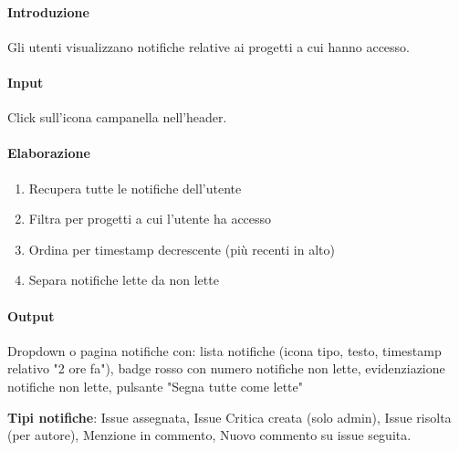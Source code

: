 \begin{reqbox}[title=REQ-FUN-19: Visualizza Notifiche]
\label{subsubsec:req-visualizza-notifiche}

\paragraph{Introduzione}
Gli utenti visualizzano notifiche relative ai progetti a cui hanno accesso.

\paragraph{Input}
Click sull'icona campanella nell'header.

\paragraph{Elaborazione}
\begin{enumerate}[leftmargin=1.1em]
\item Recupera tutte le notifiche dell'utente
\item Filtra per progetti a cui l'utente ha accesso
\item Ordina per timestamp decrescente (più recenti in alto)
\item Separa notifiche lette da non lette
\end{enumerate}

\paragraph{Output}
Dropdown o pagina notifiche con: lista notifiche (icona tipo, testo, timestamp relativo "2 ore fa"), badge rosso con numero notifiche non lette, evidenziazione notifiche non lette, pulsante "Segna tutte come lette"

\textbf{Tipi notifiche}: Issue assegnata, Issue Critica creata (solo admin), Issue risolta (per autore), Menzione in commento, Nuovo commento su issue seguita.

\end{reqbox}

\vspace{0.5cm}

\newpage



